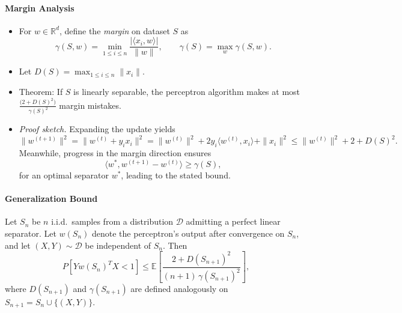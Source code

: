 \documentclass[a4paper]{article}
\begin{document}
\paragraph{Margin Analysis}
\begin{itemize}
    \item For $w \in \mathbb{R}^d$, define the \emph{margin} on dataset $S$ as
\[
\gamma(S, w) = \min_{1 \leq i \leq n} \frac{| \langle x_i, w \rangle |}{\|w\|}, 
\qquad \gamma(S) = \max_w \gamma(S, w).
\]
    \item Let $D(S) = \max_{1 \leq i \leq n} \|x_i\|$.  
    \item Theorem: If $S$ is linearly separable, the perceptron algorithm makes at most $\frac{\big(2 + D(S)^2\big)}{\,\gamma(S)^2}$ margin mistakes.
    \item \emph{Proof sketch.} Expanding the update yields
\[
\|w^{(t+1)}\|^2 = \|w^{(t)} + y_i x_i\|^2 
= \|w^{(t)}\|^2 + 2y_i \langle w^{(t)}, x_i \rangle + \|x_i\|^2
\le \|w^{(t)}\|^2 + 2 + D(S)^2.
\]
Meanwhile, progress in the margin direction ensures
\[
\langle w^\ast, w^{(t+1)} - w^{(t)} \rangle \ge \gamma(S),
\]
for an optimal separator $w^\ast$, leading to the stated bound.

\end{itemize}

\paragraph{Generalization Bound}
Let $S_n$ be $n$ i.i.d.\ samples from a distribution $\mathcal{D}$ admitting a perfect linear separator.  
Let $w(S_n)$ denote the perceptron’s output after convergence on $S_n$, and let $(X,Y) \sim \mathcal{D}$ be independent of $S_n$.  
Then
\[
    P\!\left[Y w(S_n)^T X < 1 \right] \leq \mathbb{E}[\frac{2 + D(S_{n+1})^2}{(n+1)\,\gamma(S_{n+1})^2}],
\]
where $D(S_{n+1})$ and $\gamma(S_{n+1})$ are defined analogously on $S_{n+1} = S_n \cup \{(X,Y)\}$.
\end{document}
